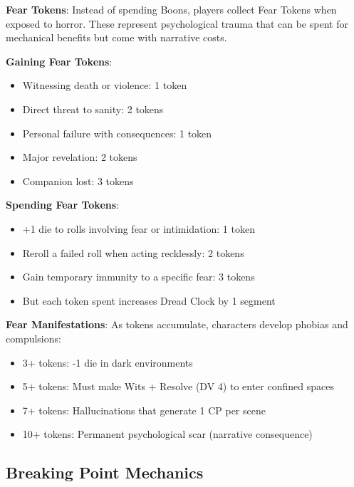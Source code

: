 \documentclass[11pt]{article}
\begin{document}
\begin{mdframed}[backgroundcolor=sanitybg]
\textbf{Fear Tokens}: Instead of spending Boons, players collect Fear Tokens when exposed to horror. These represent psychological trauma that can be spent for mechanical benefits but come with narrative costs.

\textbf{Gaining Fear Tokens}:
\begin{itemize}[leftmargin=*]
\item Witnessing death or violence: 1 token
\item Direct threat to sanity: 2 tokens
\item Personal failure with consequences: 1 token
\item Major revelation: 2 tokens
\item Companion lost: 3 tokens
\end{itemize}

\textbf{Spending Fear Tokens}:
\begin{itemize}[leftmargin=*]
\item +1 die to rolls involving fear or intimidation: 1 token
\item Reroll a failed roll when acting recklessly: 2 tokens
\item Gain temporary immunity to a specific fear: 3 tokens
\item But each token spent increases Dread Clock by 1 segment
\end{itemize}

\textbf{Fear Manifestations}: As tokens accumulate, characters develop phobias and compulsions:
\begin{itemize}[leftmargin=*]
\item 3+ tokens: -1 die in dark environments
\item 5+ tokens: Must make Wits + Resolve (DV 4) to enter confined spaces
\item 7+ tokens: Hallucinations that generate 1 CP per scene
\item 10+ tokens: Permanent psychological scar (narrative consequence)
\end{itemize}
\end{mdframed}

\subsection*{Breaking Point Mechanics}
\end{document}
